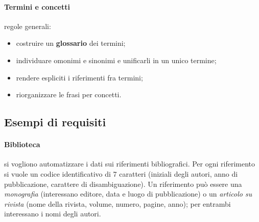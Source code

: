 \documentclass[a4paper,12pt]{article}
\begin{document}
\paragraph{Termini e concetti} regole generali:
\begin{itemize}
  \item costruire un \textbf{glossario} dei termini;
  \item individuare omonimi e sinonimi e unificarli in un unico termine;
  \item rendere espliciti i riferimenti fra termini;
  \item riorganizzare le frasi per concetti.
\end{itemize}

\subsection{Esempi di requisiti}

\paragraph{Biblioteca} si vogliono automatizzare i dati sui riferimenti
bibliografici. Per ogni riferimento si vuole un codice identificativo di 7
caratteri (iniziali degli autori, anno di pubblicazione, carattere di
disambiguazione). Un riferimento può essere una \emph{monografia} (interessano
editore, data e luogo di pubblicazione) o un \emph{articolo su rivista} (nome
della rivista, volume, numero, pagine, anno); per entrambi interessano i nomi
degli autori.
\end{document}
